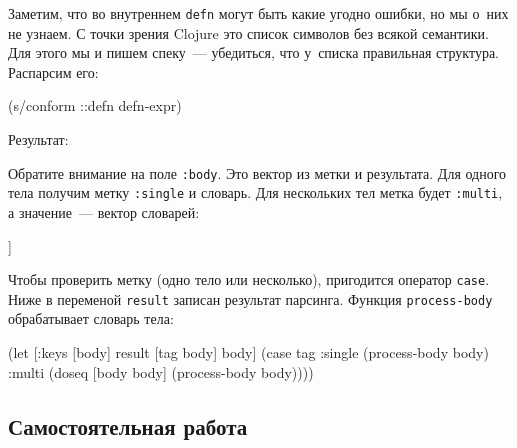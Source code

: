 Заметим, что во внутреннем \verb|defn| могут быть какие угодно ошибки, но мы
о~них не узнаем. С точки зрения Clojure это список символов без всякой
семантики. Для этого мы и пишем спеку~--- убедиться, что у~списка правильная
структура. Распарсим его:

\begin{english}
  \begin{clojure}
(s/conform ::defn defn-expr)
  \end{clojure}
\end{english}

\noindent
Результат:

\begin{english}
\end{english}

Обратите внимание на поле \verb|:body|. Это вектор из метки и результата. Для
одного тела получим метку \verb|:single| и словарь. Для нескольких тел метка
будет \verb|:multi|, а значение~--- вектор словарей:

\begin{english}
  \begin{clojure}
[:multi [{:args [x] :code [(println 1)]}
         {:args [x y] :code [(println 2)]}]]
  \end{clojure}
\end{english}

Чтобы проверить метку (одно тело или несколько), пригодится оператор
\verb|case|. Ниже в переменой \verb|result| записан результат
парсинга. Функция \verb|process-body| обрабатывает словарь тела:

\begin{english}
  \begin{clojure}
(let [{:keys [body]} result
      [tag body] body]
  (case tag
    :single
    (process-body body)
    :multi
    (doseq [body body]
      (process-body body))))
  \end{clojure}
\end{english}

\subsection{Самостоятельная работа}


